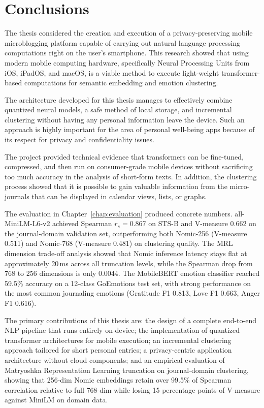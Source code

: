 \chapter{Conclusions}
\label{conclusions}

\par
The thesis considered the creation and execution of a privacy-preserving mobile microblogging platform capable of carrying out natural language processing computations right on the user’s smartphone. This research showed that using modern mobile computing hardware, specifically Neural Processing Units from iOS, iPadOS, and macOS, is a viable method to execute light-weight transformer-based computations for semantic embedding and emotion clustering.

\par
The architecture developed for this thesis manages to effectively combine quantized neural models, a safe method of local storage, and incremental clustering without having any personal information leave the device. Such an approach is highly important for the area of personal well-being apps because of its respect for privacy and confidentiality issues.

\par
The project provided technical evidence that transformers can be fine-tuned, compressed, and then run on consumer-grade mobile devices without sacrificing too much accuracy in the analysis of short-form texts. In addition, the clustering process showed that it is possible to gain valuable information from the micro-journals that can be displayed in calendar views, lists, or graphs.

\par
The evaluation in Chapter~\ref{chap:evaluation} produced concrete numbers. all-MiniLM-L6-v2 achieved Spearman $r_s = 0.867$ on STS-B and V-measure 0.662 on the journal-domain validation set, outperforming both Nomic-256 (V-measure 0.511) and Nomic-768 (V-measure 0.481) on clustering quality. The MRL dimension trade-off analysis showed that Nomic inference latency stays flat at approximately 20\,ms across all truncation levels, while the Spearman drop from 768 to 256 dimensions is only 0.0044. The MobileBERT emotion classifier reached 59.5\% accuracy on a 12-class GoEmotions test set, with strong performance on the most common journaling emotions (Gratitude F1 0.813, Love F1 0.663, Anger F1 0.616).

\par
The primary contributions of this thesis are: the design of a complete end-to-end NLP pipeline that runs entirely on-device; the implementation of quantized transformer architectures for mobile execution; an incremental clustering approach tailored for short personal entries; a privacy-centric application architecture without cloud components; and an empirical evaluation of Matryoshka Representation Learning truncation on journal-domain clustering, showing that 256-dim Nomic embeddings retain over 99.5\% of Spearman correlation relative to full 768-dim while losing 15 percentage points of V-measure against MiniLM on domain data.

